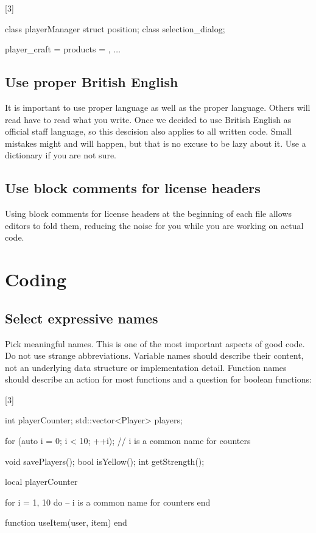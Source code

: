 \documentclass[a4paper,11pt]{scrreprt}
\newcommand{\marginMarker}[1]{%
\marginnote{%
    \hfill%
		\Huge{#1}%
}[3\baselineskip]%
}
\newcommand{\conforming}{%
\marginMarker{\textcolor{green}{\ding{51}}}%
}
\newcommand{\nonconforming}{%
\marginMarker{\textcolor{red}{\ding{55}}}%
}
\begin{document}
\nonconforming{}
\begin{cppBox}
class playerManager
struct position;
class selection_dialog;
\end{cppBox}
\begin{luaBox}[mathescape]
player_craft = {
    products = {},
    $\dots$
}
\end{luaBox}

\section{Use proper British English}
It is important to use proper language as well as the proper language. Others will read have to read what you write. Once we decided to use British English as official staff language, so this descision also applies to all written code. Small mistakes might and will happen, but that is no excuse to be lazy about it. Use a dictionary if you are not sure.

\section{Use block comments for license headers}
Using block comments for license headers at the beginning of each file allows editors to fold them, reducing the noise for you while you are working on actual code.


\chapter{Coding}
\section{Select expressive names}
Pick meaningful names. This is one of the most important aspects of good code. Do not use strange abbreviations. Variable names should describe their content, not an underlying data structure or implementation detail. Function names should describe an action for most functions and a question for boolean functions:

\conforming{}
\begin{cppBox}
int playerCounter;
std::vector<Player> players;

for (auto i = 0; i < 10; ++i); // i is a common name for counters

void savePlayers();
bool isYellow();
int getStrength();
\end{cppBox}
\begin{luaBox}
local playerCounter

for i = 1, 10 do -- i is a common name for counters
end

function useItem(user, item)
end
\end{luaBox}
\end{document}
